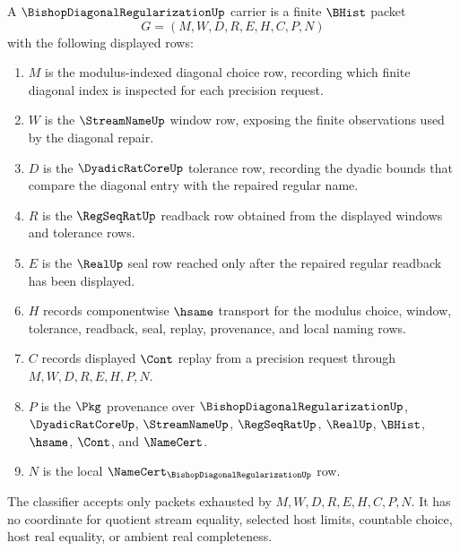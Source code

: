 \begin{definition}
\label{def:bishop-diagonal-regularization-carrier}
A $\BishopDiagonalRegularizationUp$ carrier is a finite $\BHist$ packet
$$
G=(M,W,D,R,E,H,C,P,N)
$$
with the following displayed rows:
\begin{enumerate}
\item $M$ is the modulus-indexed diagonal choice row, recording which finite diagonal index is inspected for each precision request.
\item $W$ is the $\StreamNameUp$ window row, exposing the finite observations used by the diagonal repair.
\item $D$ is the $\DyadicRatCoreUp$ tolerance row, recording the dyadic bounds that compare the diagonal entry with the repaired regular name.
\item $R$ is the $\RegSeqRatUp$ readback row obtained from the displayed windows and tolerance rows.
\item $E$ is the $\RealUp$ seal row reached only after the repaired regular readback has been displayed.
\item $H$ records componentwise $\hsame$ transport for the modulus choice, window, tolerance, readback, seal, replay, provenance, and local naming rows.
\item $C$ records displayed $\Cont$ replay from a precision request through $M,W,D,R,E,H,P,N$.
\item $P$ is the $\Pkg$ provenance over $\BishopDiagonalRegularizationUp$, $\DyadicRatCoreUp$, $\StreamNameUp$, $\RegSeqRatUp$, $\RealUp$, $\BHist$, $\hsame$, $\Cont$, and $\NameCert$.
\item $N$ is the local $\NameCert_{\BishopDiagonalRegularizationUp}$ row.
\end{enumerate}
The classifier accepts only packets exhausted by $M,W,D,R,E,H,C,P,N$. It has no coordinate for quotient stream equality, selected host limits, countable choice, host real equality, or ambient real completeness.
\end{definition}

